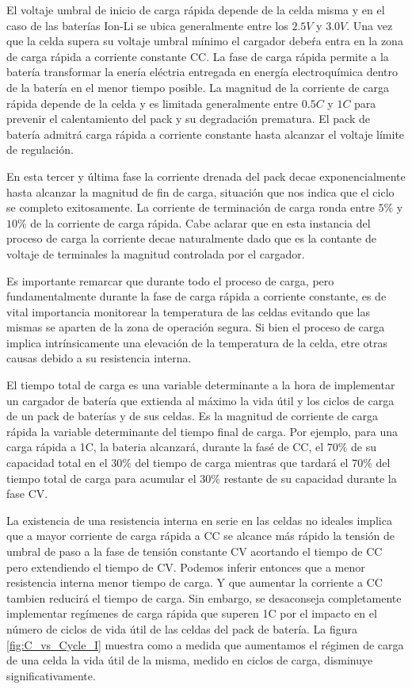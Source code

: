 \documentclass[10pt,a4paper]{article}
\begin{document}
El voltaje umbral de inicio de carga rápida depende de la celda misma y en el
caso de las baterías \acrshort{Ion-Li} se ubica generalmente entre los $2.5V$ y
$3.0V$.  Una vez que la celda supera su voltaje umbral mínimo el cargador debeŕa
entra en la zona de carga rápida a corriente constante \acrshort{CC}. La fase de
carga rápida permite a la batería transformar la enería eléctria entregada en
energía electroquímica dentro de la batería en el menor tiempo posible. La
magnitud de la corriente de carga rápida depende de la celda y es limitada
generalmente entre $0.5C$ y $1C$ para prevenir el calentamiento del pack y su
degradación prematura. El pack de batería admitrá carga rápida a corriente
constante hasta alcanzar el voltaje límite de regulación. 

En esta tercer y última fase la corriente drenada del pack decae
exponencialmente hasta alcanzar la magnitud de fin de carga, situación que nos
indica que el ciclo se completo exitosamente. La corriente de terminación de
carga ronda entre $5\%$ y $10 \%$ de la corriente de carga rápida. Cabe aclarar
que en esta instancia del proceso de carga la corriente decae naturalmente dado
que es la contante de voltaje de terminales la magnitud controlada por el
cargador.  

Es importante remarcar que durante todo el proceso de carga, pero
fundamentalmente durante la fase de carga rápida a corriente constante, es de
vital importancia monitorear la temperatura de las celdas evitando que las
mismas se aparten de la zona de operación segura. Si bien el proceso de carga
implica intrínsicamente una elevación de la temperatura de la celda, etre otras
causas debido a su resistencia interna.

El tiempo total de carga es una variable determinante a la hora de implementar
un cargador de batería que extienda al máximo la vida útil y los ciclos de carga
de un pack de baterías y de sus celdas. Es la magnitud de corriente de carga
rápida la variable determinante del tiempo final de carga. Por ejemplo, para una
carga rápida a 1C, la bateria alcanzará, durante la fasé de \acrshort{CC}, el
$70\%$ de su capacidad total en el $30\%$ del tiempo de carga mientras que
tardará el $70\%$ del tiempo total de carga para acumular el $30\%$ restante de
su capacidad durante la fase \acrshort{CV}. 

La existencia de una resistencia interna en serie en las celdas no ideales
implica que a mayor corriente de carga rápida a CC se alcance más rápido la
tensión de umbral de paso a la fase de tensión constante CV acortando el tiempo
de CC pero extendiendo el tiempo de CV. Podemos inferir entonces que a menor
resistencia interna menor tiempo de carga. Y que aumentar la corriente a CC
tambien reducirá el tiempo de carga.  Sin embargo, se desaconseja completamente
implementar regímenes de carga rápida que superen 1C por el impacto en el número
de ciclos de vida útil de las celdas del pack de batería. La figura
\ref{fig:C_vs_Cycle_I} muestra como a medida que aumentamos el régimen de carga
de una celda la vida útil de la misma, medido en ciclos de carga, disminuye
significativamente.
\end{document}
